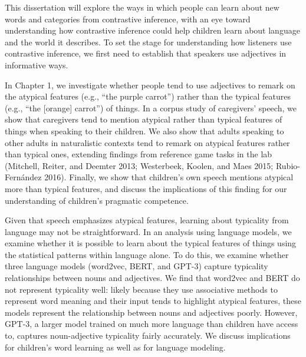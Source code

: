 \documentclass{ucetd}
\begin{document}
This dissertation will explore the ways in which people can learn about
new words and categories from contrastive inference, with an eye toward
understanding how contrastive inference could help children learn about
language and the world it describes. To set the stage for understanding
how listeners use contrastive inference, we first need to establish that
speakers use adjectives in informative ways.

In Chapter 1, we investigate whether people tend to use adjectives to
remark on the atypical features (e.g., ``the purple carrot'') rather
than the typical features (e.g., ``the {[}orange{]} carrot'') of things.
In a corpus study of caregivers' speech, we show that caregivers tend to
mention atypical rather than typical features of things when speaking to
their children. We also show that adults speaking to other adults in
naturalistic contexts tend to remark on atypical features rather than
typical ones, extending findings from reference game tasks in the lab
(Mitchell, Reiter, and Deemter 2013; Westerbeek, Koolen, and Maes 2015;
Rubio-Fernández 2016). Finally, we show that children's own speech
mentions atypical more than typical features, and discuss the
implications of this finding for our understanding of children's
pragmatic competence.

Given that speech emphasizes atypical features, learning about
typicality from language may not be straightforward. In an analysis
using language models, we examine whether it is possible to learn about
the typical features of things using the statistical patterns within
language alone. To do this, we examine whether three language models
(word2vec, BERT, and GPT-3) capture typicality relationships between
nouns and adjectives. We find that word2vec and BERT do not represent
typicality well: likely because they use associative methods to
represent word meaning and their input tends to highlight atypical
features, these models represent the relationship between nouns and
adjectives poorly. However, GPT-3, a larger model trained on much more
language than children have access to, captures noun-adjective
typicality fairly accurately. We discuss implications for children's
word learning as well as for language modeling.
\end{document}
